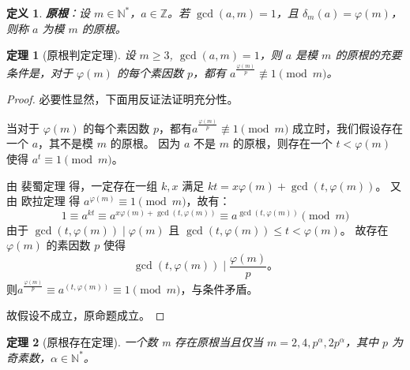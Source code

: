 \documentclass[10pt]{ctexart}
\newtheorem{definition}{定义}
\newtheorem{theorem}{定理}
\begin{document}
\begin{definition}
	\textbf{原根}：设 $m \in \mathbb{N}^{*}$，$a\in \mathbb{Z}$。若 $\gcd(a,m)=1$，且 $\delta_m(a)=\varphi(m)$，则称 $a$ 为模 $m$ 的原根。
\end{definition}

\begin{theorem}[原根判定定理]
	设 $m \geqslant 3$, $\gcd(a,m)=1$，则 $a$ 是模 $m$ 的原根的充要条件是，对于 $\varphi(m)$ 的每个素因数 $p$，都有 $a^{\frac{\varphi(m)}{p}}\not\equiv 1\pmod m$。
\end{theorem}
\begin{proof}
	必要性显然，下面用反证法证明充分性。

	当对于 $\varphi(m)$ 的每个素因数 $p$，都有$a^{\frac{\varphi(m)}{p}}\not\equiv 1\pmod m$ 成立时，我们假设存在一个 $a$，其不是模 $m$ 的原根。
	因为 $a$ 不是 $m$ 的原根，则存在一个 $t<\varphi(m)$ 使得 $a^t\equiv 1\pmod{m}$。

	由 裴蜀定理 得，一定存在一组 $k,x$ 满足 $kt=x\varphi(m)+\gcd(t,\varphi(m))$。
	又由 欧拉定理 得 $a^{\varphi(m)}\equiv 1\pmod{m}$，故有：
	$$
	1\equiv a^{kt}\equiv a^{x\varphi(m)+\gcd(t,\varphi(m))}\equiv a^{\gcd(t,\varphi(m))}\pmod{m}
	$$
	由于 $\gcd(t, \varphi(m)) \mid \varphi(m)$ 且 $\gcd(t, \varphi(m))\leqslant t < \varphi(m)$。
	故存在 $\varphi(m)$ 的素因数 $p$ 使得 
	$$ 
	\gcd(t, \varphi(m)) \mid \frac{\varphi(m)}{p}。
	$$
	则$a^{\frac{\varphi(m)}{p}}\equiv a^{(t, \varphi(m))}\equiv 1\pmod{m}$，与条件矛盾。

	故假设不成立，原命题成立。
\end{proof}

\begin{theorem}[原根存在定理]
	一个数 m 存在原根当且仅当 $m=2,4,p^{\alpha},2p^{\alpha}$，其中 $p$ 为奇素数，$\alpha\in \mathbb{N}^{*}$。
\end{theorem}
\end{document}
